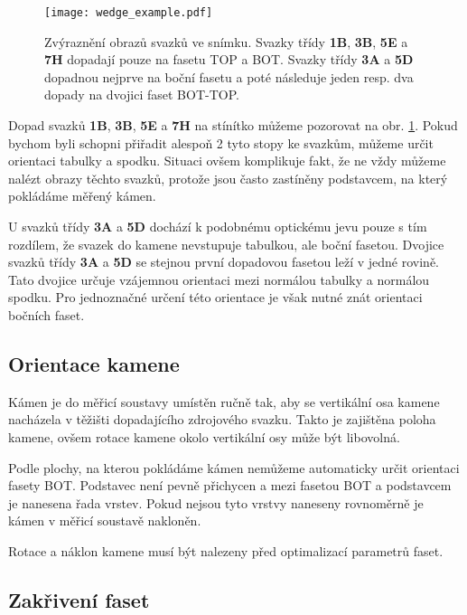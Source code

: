 \begin{figure} [h!]
\centering
\texttt{[image: wedge\_example.pdf]}
\caption[Obrazy svazků ve snímku.]{Zvýraznění obrazů svazků ve snímku. Svazky třídy \textbf{1B}, \textbf{3B}, \textbf{5E} a \textbf{7H} dopadají pouze na fasetu TOP a BOT. Svazky třídy \textbf{3A} a \textbf{5D} dopadnou nejprve na boční fasetu a poté následuje jeden resp. dva dopady na dvojici faset BOT-TOP.}
\label{fig:wedge_example_image}
\end{figure}

\newpage
Dopad svazků  \textbf{1B}, \textbf{3B}, \textbf{5E} a \textbf{7H} na stínítko můžeme pozorovat na obr. \ref{fig:wedge_example_image}. Pokud bychom byli schopni přiřadit alespoň 2 tyto stopy ke svazkům, můžeme určit orientaci tabulky a spodku. Situaci ovšem komplikuje fakt, že ne vždy můžeme nalézt obrazy těchto svazků, protože jsou často zastíněny podstavcem, na který pokládáme měřený kámen. 
 
 U svazků třídy \textbf{3A} a \textbf{5D} dochází k podobnému optickému jevu pouze s tím rozdílem, že svazek do kamene nevstupuje tabulkou, ale boční fasetou. Dvojice svazků třídy \textbf{3A} a \textbf{5D} se stejnou první dopadovou fasetou leží v jedné rovině.  Tato dvojice určuje vzájemnou orientaci mezi normálou tabulky a normálou spodku. Pro jednoznačné určení této orientace je však nutné znát orientaci bočních faset.  


\subsection{Orientace kamene}
Kámen je do měřicí soustavy umístěn ručně tak, aby se vertikální osa kamene nacházela v těžišti dopadajícího zdrojového svazku. Takto je zajištěna poloha kamene, ovšem rotace kamene okolo vertikální osy může být libovolná. 

Podle plochy, na kterou pokládáme kámen nemůžeme automaticky určit orientaci fasety BOT. Podstavec není pevně přichycen a mezi fasetou BOT a podstavcem je nanesena řada vrstev. Pokud nejsou tyto vrstvy naneseny rovnoměrně je kámen v měřicí soustavě nakloněn.

Rotace a náklon kamene musí být nalezeny před optimalizací parametrů faset. 



\subsection{Zakřivení faset} 

